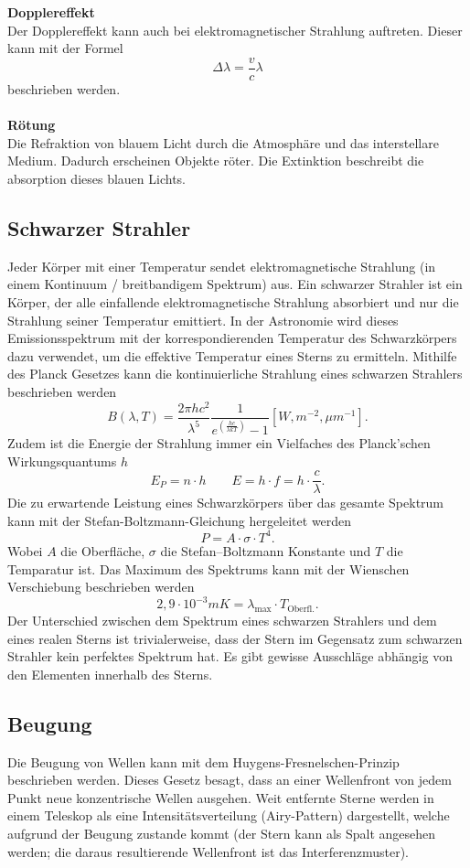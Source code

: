 \documentclass[a4paper,12pt]{article}
\begin{document}
\\\hfill\\\textbf{Dopplereffekt}\\ 
Der Dopplereffekt kann auch bei elektromagnetischer Strahlung auftreten. Dieser kann mit der Formel
\[ 
        \Delta \lambda =\dfrac{v}{c}\lambda 
\] 
beschrieben werden.
\\\hfill\\\textbf{Rötung}\\ 
Die Refraktion von blauem Licht durch die Atmosphäre und das interstellare Medium. Dadurch erscheinen Objekte röter. Die Extinktion beschreibt die absorption dieses blauen Lichts.

\subsection{Schwarzer Strahler}
Jeder Körper mit einer Temperatur sendet elektromagnetische Strahlung (in einem Kontinuum / breitbandigem Spektrum) aus. Ein schwarzer Strahler ist ein Körper, der alle einfallende elektromagnetische Strahlung absorbiert und nur die Strahlung seiner Temperatur emittiert. In der Astronomie wird dieses Emissionsspektrum mit der korrespondierenden Temperatur des Schwarzkörpers dazu verwendet, um die effektive Temperatur eines Sterns zu ermitteln. Mithilfe des Planck Gesetzes kann die kontinuierliche Strahlung eines schwarzen Strahlers beschrieben werden
\[ 
        B\left(\lambda ,T\right)=\dfrac{2\pi hc ^2}{\lambda ^{5}}\dfrac{1}{e^{\left(\tfrac{hc}{\lambda kT}\right)}-1}[W,m ^{-2},\mu m ^{-1}]
.\] 
Zudem ist die Energie der Strahlung immer ein Vielfaches des Planck'schen Wirkungsquantums $h$ 
\[ 
        E_P=n\cdot h\qquad E=h\cdot f=h\cdot \dfrac{c}{\lambda }
.\] 
Die zu erwartende Leistung eines Schwarzkörpers über das gesamte Spektrum kann mit der Stefan-Boltzmann-Gleichung hergeleitet werden
\[ 
        P=A\cdot \sigma \cdot T^{4}
.\] 
Wobei $A$ die Oberfläche, $\sigma $ die Stefan--Boltzmann Konstante und $T$ die Temparatur ist. Das Maximum des Spektrums kann mit der Wienschen Verschiebung beschrieben werden
\[ 
        2,9\cdot 10^{-3}mK=\lambda _{\text{max}}\cdot T_{\text{Oberfl.}}
.\] 
Der Unterschied zwischen dem Spektrum eines schwarzen Strahlers und dem eines realen Sterns ist trivialerweise, dass der Stern im Gegensatz zum schwarzen Strahler kein perfektes Spektrum hat. Es gibt gewisse Ausschläge abhängig von den Elementen innerhalb des Sterns.

\subsection{Beugung}
Die Beugung von Wellen kann mit dem Huygens-Fresnelschen-Prinzip beschrieben werden. Dieses Gesetz besagt, dass an einer Wellenfront von jedem Punkt neue konzentrische Wellen ausgehen. Weit entfernte Sterne werden in einem Teleskop als eine Intensitätsverteilung (Airy-Pattern) dargestellt, welche aufgrund der Beugung zustande kommt (der Stern kann als Spalt angesehen werden; die daraus resultierende Wellenfront ist das Interferenzmuster).
\end{document}
